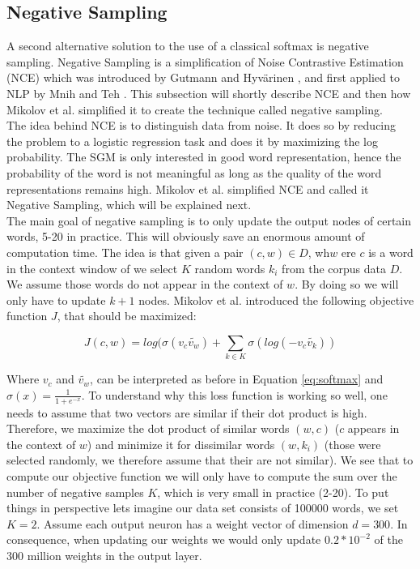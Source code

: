 \subsection{Negative Sampling}
A second alternative solution to the use of a classical softmax is negative sampling. Negative Sampling is a simplification of Noise Contrastive Estimation (NCE) which was introduced by Gutmann and Hyv{\"a}rinen \citep{nce-original}, and first applied to NLP by Mnih and Teh \citep{mnih}. This subsection will shortly describe NCE and then how Mikolov et al. \citep{mikolov2} simplified it to create the technique called negative sampling. \\ The idea behind NCE is to distinguish data from noise. It does so by reducing the problem to a logistic regression task and does it by maximizing the log probability. The SGM is only interested in good word representation, hence the probability of the word is not meaningful as long as the quality of the word representations remains high. Mikolov et al. \citep{mikolov2} simplified NCE and called it Negative Sampling, which will be explained next.\\
The main goal of negative sampling is to only update the output nodes of certain words, 5-20 in practice. This will obviously save an enormous amount of computation time. The idea is that given a pair $(c,w) \in D$, wh$w$ ere $c$ is a word in the context window of we select $K$ random words $k_i$ from the corpus data $D$. We assume those words do not appear in the context of $w$. By doing so we will only have to update $k+1$ nodes. Mikolov et al. \citep{mikolov2} introduced the following objective function $J$, that should be maximized:

\begin{equation}
J(c,w)= log(\sigma(v_c \tilde{v_w } ) + \sum_{k\in K} \sigma(log(-v_c \tilde{v_k} ))
\end{equation}\label{eq:obj_neg_samples}

Where $v_c$ and $\tilde{v_w }$, can be interpreted as before in Equation \ref{eq:softmax} and $\sigma(x) = \frac{1}{1+e^{-x}}$. To  understand why this loss function is working so well, one needs to assume that two vectors are similar if their dot product is high. Therefore, we maximize the dot product of similar words $(w,c)$ ($c$ appears in the context of $w$) and minimize it for dissimilar words $(w,k_i)$ (those were selected randomly, we therefore assume that their are not similar).
We see that to compute our objective function we will only have to compute the sum over the number of negative samples $K$, which is very small in practice (2-20). To put things in perspective lets imagine our data set consists of 100000 words, we set $K=2$. Assume each output neuron has a weight vector of dimension $d = 300$. In consequence, when updating our weights we would only update $0.2*10^{-2}$ of the 300 million weights in the output layer.

